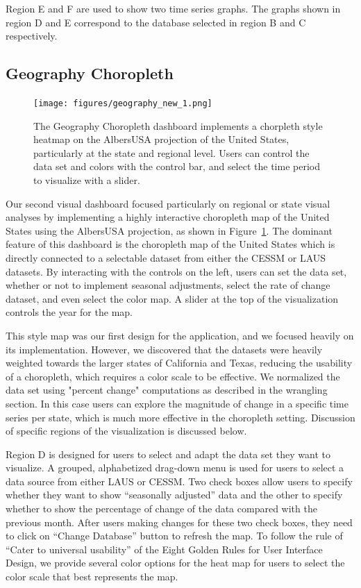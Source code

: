 \documentclass{sigchi}
\begin{document}
Region E and F are used to show two time series graphs. The graphs shown in region D and E correspond to the  database selected in region B and C respectively.

\subsection{Geography Choropleth}

\begin{figure}[!ht]
    \centering
    \texttt{[image: figures/geography\_new\_1.png]}
    \caption{The Geography Choropleth dashboard implements a chorpleth style heatmap on the AlbersUSA projection of the United States, particularly at the state and regional level. Users can control the data set and colors with the control bar, and select the time period to visualize with a slider.}
    \label{fig:Geography}
\end{figure}

Our second visual dashboard focused particularly on regional or state visual analyses by implementing a highly interactive choropleth map of the United States using the AlbersUSA projection, as shown in Figure~\ref{fig:Geography}. The dominant feature of this dashboard is the choropleth map of the United States which is directly connected to a selectable dataset from either the CESSM or LAUS datasets. By interacting with the controls on the left, users can set the data set, whether or not to implement seasonal adjustments, select the rate of change dataset, and even select the color map. A slider at the top of the visualization controls the year for the map.

This style map was our first design for the application, and we focused heavily on its implementation. However, we discovered that the datasets were heavily weighted towards the larger states of California and Texas, reducing the usability of a choropleth, which requires a color scale to be effective. We normalized the data set using "percent change" computations as described in the wrangling section. In this case users can explore the magnitude of change in a specific time series per state, which is much more effective in the choropleth setting. Discussion of specific regions of the visualization is discussed below.

Region D is designed for users to select and adapt the data set they want to visualize. A grouped, alphabetized drag-down menu is used for users to select a data source from either LAUS or CESSM. Two check boxes allow users to specify whether they want to show ``seasonally adjusted'' data and the other to specify whether to show the percentage of change of the data compared with the previous month. After users making changes for these two check boxes, they need to click on ``Change Database'' button to refresh the map. To follow the rule of ``Cater to universal usability'' of the Eight Golden Rules for User Interface Design, we provide several color options for the heat map for users to select the color scale that best represents the map.
\end{document}
